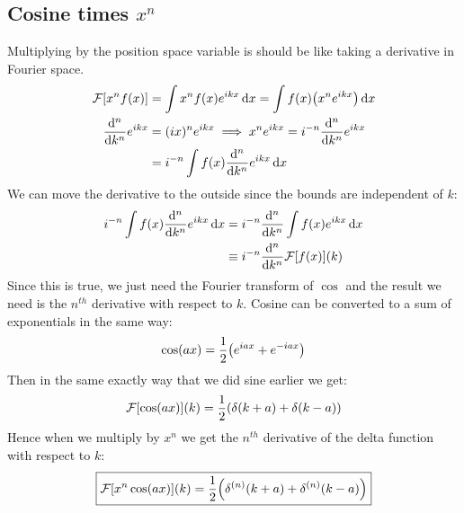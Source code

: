 \documentclass[12pt]{article}
\newcommand{\F}{\mathcal{F}}
\begin{document}
\subsection{Cosine times $x^n$}
Multiplying by the position space variable is should be like taking a derivative in Fourier space.
\begin{align*}
  \F[x^nf(x)]&=\int x^nf(x)e^{ikx}\dd{x}=\int f(x)\qty(x^ne^{ikx})\dd{x}\\
  \dv[n]{k}e^{ikx}&=(ix)^ne^{ikx}\implies x^ne^{ikx}=i^{-n}\dv[n]{k}e^{ikx}\\
  &=i^{-n}\int f(x)\dv[n]{k}e^{ikx}\dd{x}
\end{align*}
We can move the derivative to the outside since the bounds are independent of $k$:
\begin{align*}
  i^{-n}\int f(x)\dv[n]{k}e^{ikx}\dd{x}&=i^{-n}\dv[n]{k}\int f(x)e^{ikx}\dd{x}\\
  &\equiv i^{-n}\dv[n]{k}\F[f(x)](k)
\end{align*}
Since this is true, we just need the Fourier transform of $\cos$ and the result we need is the $n^{th}$ derivative with respect to $k$. Cosine can be converted to a sum of exponentials in the same way:
\begin{align*}
  \cos(ax)=\frac12\qty(e^{iax}+e^{-iax})
\end{align*}
Then in the same exactly way that we did sine earlier we get:
\begin{align*}
  \F[\cos(ax)](k)=\frac12\qty(\delta(k+a)+\delta(k-a))
\end{align*}
Hence when we multiply by $x^n$ we get the $n^{th}$ derivative of the delta function with respect to $k$:
\begin{align}
  \boxed{\F[x^n\cos(ax)](k)=\frac12\qty(\delta^{(n)}(k+a)+\delta^{(n)}(k-a))}
\end{align}
\end{document}
